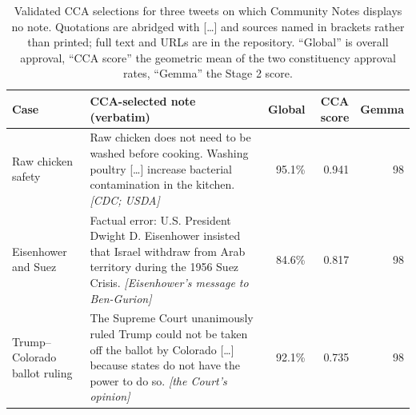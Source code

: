 \documentclass[10pt,twocolumn]{article}
\begin{document}
\begin{table}[t]
\centering
\footnotesize
\setlength{\tabcolsep}{3pt}
\renewcommand{\arraystretch}{1.12}
\begin{tabularx}{\textwidth}{@{}p{2.4cm}>{\raggedright\arraybackslash}Xrrr@{}}
\toprule
\textbf{Case} & \textbf{CCA-selected note (verbatim)} &
\textbf{Global} & \textbf{CCA score} & \textbf{Gemma} \\
\midrule
Raw chicken safety &
Raw chicken does not need to be washed before cooking. Washing poultry
[\ldots] increase bacterial contamination in the kitchen. \emph{[CDC; USDA]}
& 95.1\% & 0.941 & 98 \\
\addlinespace
Eisenhower and Suez &
Factual error: U.S. President Dwight D. Eisenhower insisted that Israel
withdraw from Arab territory during the 1956 Suez Crisis.
\emph{[Eisenhower's message to Ben-Gurion]}
& 84.6\% & 0.817 & 98 \\
\addlinespace
Trump--Colorado ballot ruling &
The Supreme Court unanimously ruled Trump could not be taken off the ballot by
Colorado [\ldots] because states do not have the power to do so.
\emph{[the Court's opinion]}
& 92.1\% & 0.735 & 98 \\
\bottomrule
\end{tabularx}
\caption{Validated CCA selections for three tweets on which Community Notes
displays no note. Quotations are abridged with [\ldots] and sources named in
brackets rather than printed; full text and URLs are in the repository.
``Global'' is overall approval, ``CCA score'' the geometric mean of the two
constituency approval rates, ``Gemma'' the Stage 2 score.}
\label{tab:hidden-rescue-cases}
\end{table}
\end{document}
